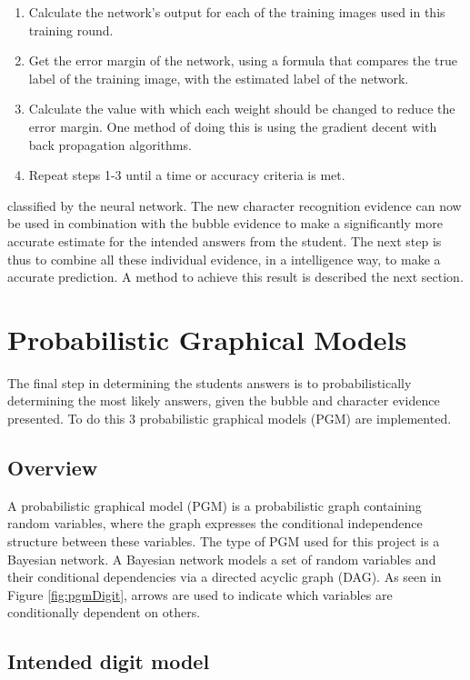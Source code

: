 \begin{enumerate}
\item Calculate the network's output for each of the training images used in this training round.
\item Get the error margin of the network, using a formula that compares the true label of the training image, with the estimated label of the network.
\item Calculate the value with which each weight should be changed to reduce the error margin. One method of doing this is using the gradient decent with back propagation algorithms.
\item Repeat steps 1-3 until a time or accuracy criteria is met.
\end{enumerate}

classified by the neural network. The new character recognition evidence can now be used in combination with the bubble evidence to make a significantly more accurate estimate for the intended answers from the student. The next step is thus to combine all these individual evidence, in a intelligence way, to make a accurate prediction. A method to achieve this result is described the next section.


\section{Probabilistic Graphical Models}
\label{sec:PGM}

The final step in determining the students answers is to probabilistically determining the most likely answers, given the bubble and character evidence presented. To do this 3 probabilistic graphical models (PGM) are implemented.

\subsection{Overview}

A probabilistic graphical model (PGM) is a probabilistic graph containing random variables, where the graph expresses the conditional independence structure between these variables. The type of PGM used for this project is a Bayesian network. A Bayesian network models a set of random variables and their conditional dependencies via a directed acyclic graph (DAG). As seen in Figure \ref{fig:pgmDigit}, arrows are used to indicate which variables are conditionally dependent on others. 

\subsection{Intended digit model}

